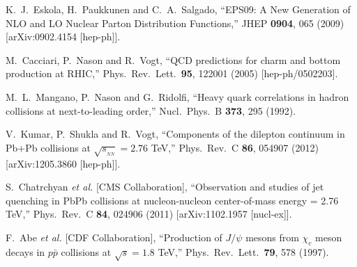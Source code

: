 \documentclass[aps,prc,preprint,superscriptaddress,showpacs,showkeys]{revtex4-1}
\begin{document}
\begin{thebibliography}{100}
  K.~J.~Eskola, H.~Paukkunen and C.~A.~Salgado,
  ``EPS09: A New Generation of NLO and LO Nuclear Parton Distribution Functions,''
  JHEP {\bf 0904}, 065 (2009)
  [arXiv:0902.4154 [hep-ph]].

  M.~Cacciari, P.~Nason and R.~Vogt,
  ``QCD predictions for charm and bottom production at RHIC,''
  Phys.\ Rev.\ Lett.\  {\bf 95}, 122001 (2005)
  [hep-ph/0502203].



  M.~L.~Mangano, P.~Nason and G.~Ridolfi,
  ``Heavy quark correlations in hadron collisions at next-to-leading order,''
  Nucl.\ Phys.\ B {\bf 373}, 295 (1992).


  V.~Kumar, P.~Shukla and R.~Vogt,
  ``Components of the dilepton continuum in Pb+Pb collisions at $\sqrt{s_{_{NN}}} = 2.76 $ TeV,''
  Phys.\ Rev.\ C {\bf 86}, 054907 (2012)
  [arXiv:1205.3860 [hep-ph]].

  S.~Chatrchyan {\it et al.}  [CMS Collaboration],
  ``Observation and studies of jet quenching in PbPb collisions at nucleon-nucleon center-of-mass energy = 2.76 TeV,''
  Phys.\ Rev.\ C {\bf 84}, 024906 (2011)
  [arXiv:1102.1957 [nucl-ex]].

  F.~Abe {\it et al.}  [CDF Collaboration],
  ``Production of $J/\psi$ mesons from $\chi_c$ meson decays in $p\bar{p}$ collisions at $\sqrt{s} = 1.8$ TeV,''
  Phys.\ Rev.\ Lett.\  {\bf 79}, 578 (1997).



\end{thebibliography}
\end{document}
